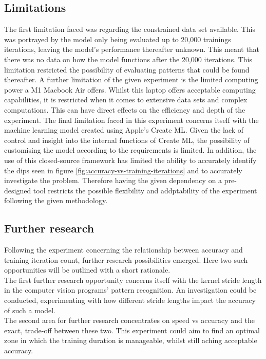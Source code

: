 \subsection{Limitations}
The first limitation faced was regarding the constrained data set available. This was portrayed by the model only being evaluated up to 20,000 trainings iterations, leaving the model's performance thereafter unknown. This meant that there was no data on how the model functions after the 20,000 iterations. This limitation restricted the possibility of evaluating patterns that could be found thereafter.
A further limitation of the given experiment is the limited computing power a M1 Macbook Air offers. Whilst this laptop offers acceptable computing capabilities, it is restricted when it comes to extensive data sets and complex computations. This can have direct effects on the efficiency and depth of the experiment.
The final limitation faced in this experiment concerns itself with the machine learning model created using Apple's Create ML. 
Given the lack of control and insight into the internal functions of Create ML, the possibility of customising the model according to the
requirements is limited. In addition, the use of this closed-source framework has limited the ability to accurately identify the dips 
seen in figure \ref{fig:accuracy-vs-training-iterations} and to accurately investigate the problem. 
Therefore having the given dependency on a pre-designed tool restricts the possible flexibility and addptability of the experiment following the given methodology. \\

\subsection{Further research}
Following the experiment concerning the relationship between accuracy and training iteration count, further research possibilities emerged. Here two such opportunities will be outlined with a short rationale. \\

The first further research opportunity concerns itself with the kernel stride length in the computer vision programs' pattern recognition. An investigation could be conducted, experimenting with how different stride lengths impact the accuracy of such a model.  \\

The second area for further research concentrates on speed vs accuracy and the exact, trade-off between these two. This experiment could aim to find an optimal zone in which the training duration is manageable, whilst still aching acceptable accuracy.  \\




